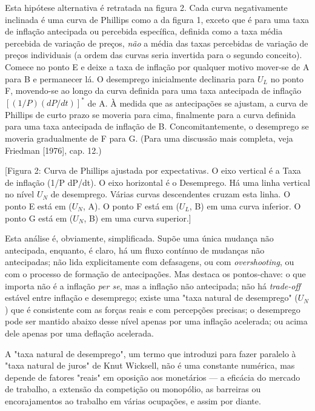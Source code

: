 \documentclass[12pt]{article}
\begin{document}
Esta hipótese alternativa é retratada na figura 2. Cada curva negativamente inclinada é uma curva de Phillips como a da figura 1, exceto que é para uma taxa de inflação antecipada ou percebida específica, definida como a taxa média percebida de variação de preços, \textit{não} a média das taxas percebidas de variação de preços individuais (a ordem das curvas seria invertida para o segundo conceito). Comece no ponto E e deixe a taxa de inflação por qualquer motivo mover-se de A para B e permanecer lá. O desemprego inicialmente declinaria para $U_L$ no ponto F, movendo-se ao longo da curva definida para uma taxa antecipada de inflação $[(1/P)(dP/dt)]^*$ de A. À medida que as antecipações se ajustam, a curva de Phillips de curto prazo se moveria para cima, finalmente para a curva definida para uma taxa antecipada de inflação de B. Concomitantemente, o desemprego se moveria gradualmente de F para G. (Para uma discussão mais completa, veja Friedman [1976], cap. 12.)

\begin{center}
[Figura 2: Curva de Phillips ajustada por expectativas. O eixo vertical é a Taxa de inflação (1/P dP/dt). O eixo horizontal é o Desemprego. Há uma linha vertical no nível $U_N$ de desemprego. Várias curvas descendentes cruzam esta linha. O ponto E está em ($U_N$, A). O ponto F está em ($U_L$, B) em uma curva inferior. O ponto G está em ($U_N$, B) em uma curva superior.]
\end{center}

Esta análise é, obviamente, simplificada. Supõe uma única mudança não antecipada, enquanto, é claro, há um fluxo contínuo de mudanças não antecipadas; não lida explicitamente com defasagens, ou com \textit{overshooting}, ou com o processo de formação de antecipações. Mas destaca os pontos-chave: o que importa não é a inflação \textit{per se}, mas a inflação não antecipada; não há \textit{trade-off} estável entre inflação e desemprego; existe uma "taxa natural de desemprego" ($U_N$) que é consistente com as forças reais e com percepções precisas; o desemprego pode ser mantido abaixo desse nível apenas por uma inflação acelerada; ou acima dele apenas por uma deflação acelerada.

A "taxa natural de desemprego", um termo que introduzi para fazer paralelo à "taxa natural de juros" de Knut Wicksell, não é uma constante numérica, mas depende de fatores "reais" em oposição aos monetários — a eficácia do mercado de trabalho, a extensão da competição ou monopólio, as barreiras ou encorajamentos ao trabalho em várias ocupações, e assim por diante.
\end{document}

